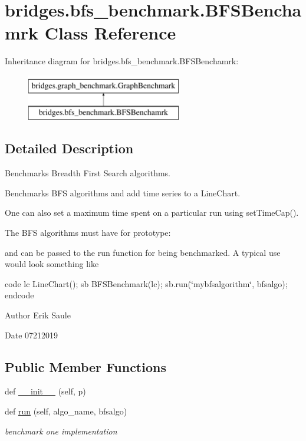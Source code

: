 \hypertarget{classbridges_1_1bfs__benchmark_1_1_b_f_s_benchamrk}{}\section{bridges.\+bfs\+\_\+benchmark.\+B\+F\+S\+Benchamrk Class Reference}
\label{classbridges_1_1bfs__benchmark_1_1_b_f_s_benchamrk}
Inheritance diagram for bridges.\+bfs\+\_\+benchmark.\+B\+F\+S\+Benchamrk\+:\begin{figure}[H]
\begin{center}
\leavevmode
\includegraphics[height=2.000000cm]{classbridges_1_1bfs__benchmark_1_1_b_f_s_benchamrk}
\end{center}
\end{figure}


\subsection{Detailed Description}
Benchmarks Breadth First Search algorithms. 

Benchmarks B\+FS algorithms and add time series to a Line\+Chart.

One can also set a maximum time spent on a particular run using set\+Time\+Cap().

The B\+FS algorithms must have for prototype\+:

and can be passed to the run function for being benchmarked. A typical use would look something like

code lc Line\+Chart(); sb B\+F\+S\+Benchmark(lc); sb.\+run(\char`\"{}mybfsalgorithm\char`\"{}, bfsalgo); endcode

\begin{DoxyAuthor}{Author}
Erik Saule 
\end{DoxyAuthor}
\begin{DoxyDate}{Date}
07212019 
\end{DoxyDate}
\subsection*{Public Member Functions}
\begin{DoxyCompactItemize}
\item 
def \hyperlink{classbridges_1_1bfs__benchmark_1_1_b_f_s_benchamrk_ad95e0cd6ce0de759ba17de26eb6365c6}{\+\_\+\+\_\+init\+\_\+\+\_\+} (self, p)
\item 
def \hyperlink{classbridges_1_1bfs__benchmark_1_1_b_f_s_benchamrk_a854cbb0fedcdecf2601ce4a45a393ce7}{run} (self, algo\+\_\+name, bfsalgo)
\begin{DoxyCompactList}\small\item\em benchmark one implementation \end{DoxyCompactList}\end{DoxyCompactItemize}


